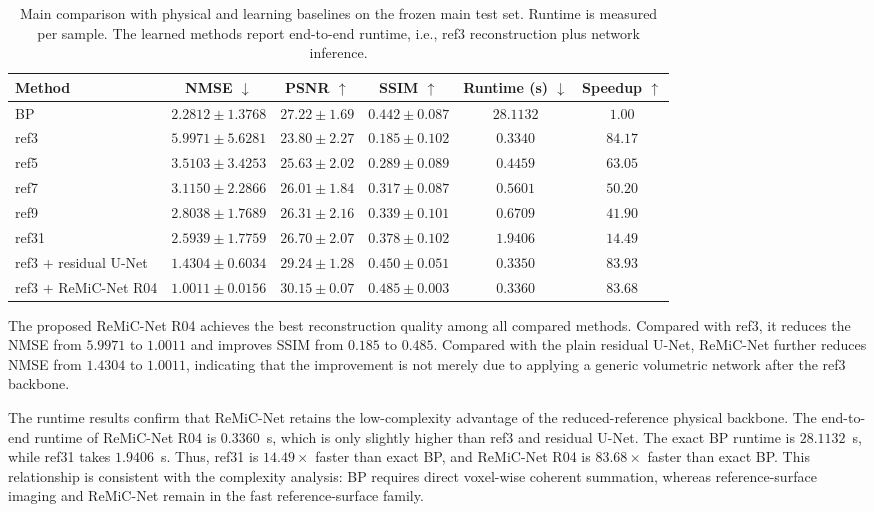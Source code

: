 \documentclass[journal]{IEEEtran}
\begin{document}
\begin{table}[!t]
\centering
\caption{Main comparison with physical and learning baselines on the frozen main test set. Runtime is measured per sample. The learned methods report end-to-end runtime, i.e., ref3 reconstruction plus network inference.}
\label{tab:main_comparison}
\renewcommand{\arraystretch}{1.10}
\begin{tabular}{lccccc}
\hline
Method & NMSE $\downarrow$ & PSNR $\uparrow$ & SSIM $\uparrow$ & Runtime (s) $\downarrow$ & Speedup $\uparrow$ \\
\hline
BP & $2.2812 \pm 1.3768$ & $27.22 \pm 1.69$ & $0.442 \pm 0.087$ & $28.1132$ & $1.00$ \\
ref3 & $5.9971 \pm 5.6281$ & $23.80 \pm 2.27$ & $0.185 \pm 0.102$ & $0.3340$ & $84.17$ \\
ref5 & $3.5103 \pm 3.4253$ & $25.63 \pm 2.02$ & $0.289 \pm 0.089$ & $0.4459$ & $63.05$ \\
ref7 & $3.1150 \pm 2.2866$ & $26.01 \pm 1.84$ & $0.317 \pm 0.087$ & $0.5601$ & $50.20$ \\
ref9 & $2.8038 \pm 1.7689$ & $26.31 \pm 2.16$ & $0.339 \pm 0.101$ & $0.6709$ & $41.90$ \\
ref31 & $2.5939 \pm 1.7759$ & $26.70 \pm 2.07$ & $0.378 \pm 0.102$ & $1.9406$ & $14.49$ \\
ref3 + residual U-Net & $1.4304 \pm 0.6034$ & $29.24 \pm 1.28$ & $0.450 \pm 0.051$ & $0.3350$ & $83.93$ \\
ref3 + ReMiC-Net R04 & $\mathbf{1.0011 \pm 0.0156}$ & $\mathbf{30.15 \pm 0.07}$ & $\mathbf{0.485 \pm 0.003}$ & $0.3360$ & $83.68$ \\
\hline
\end{tabular}
\end{table}

The proposed ReMiC-Net R04 achieves the best reconstruction quality among all compared methods. Compared with ref3, it reduces the NMSE from $5.9971$ to $1.0011$ and improves SSIM from $0.185$ to $0.485$. Compared with the plain residual U-Net, ReMiC-Net further reduces NMSE from $1.4304$ to $1.0011$, indicating that the improvement is not merely due to applying a generic volumetric network after the ref3 backbone.

The runtime results confirm that ReMiC-Net retains the low-complexity advantage of the reduced-reference physical backbone. The end-to-end runtime of ReMiC-Net R04 is $0.3360$~s, which is only slightly higher than ref3 and residual U-Net. The exact BP runtime is $28.1132$~s, while ref31 takes $1.9406$~s. Thus, ref31 is $14.49\times$ faster than exact BP, and ReMiC-Net R04 is $83.68\times$ faster than exact BP. This relationship is consistent with the complexity analysis: BP requires direct voxel-wise coherent summation, whereas reference-surface imaging and ReMiC-Net remain in the fast reference-surface family.
\end{document}
